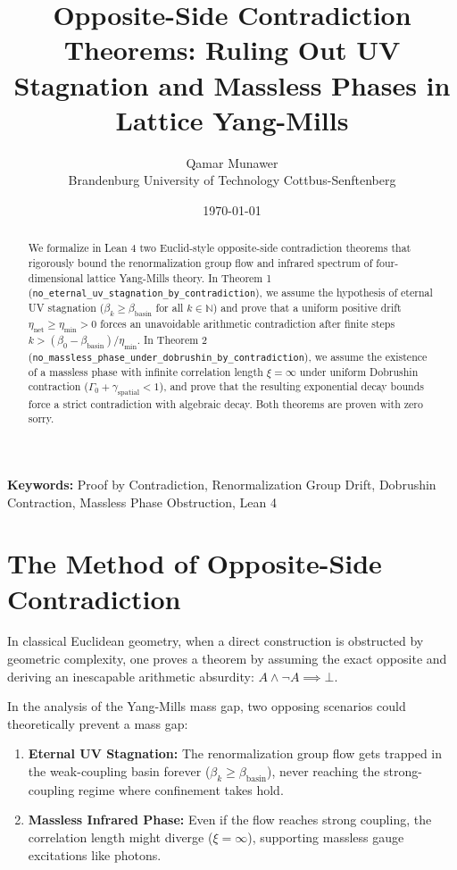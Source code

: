 \documentclass[11pt,a4paper]{article}
\title{\textbf{Opposite-Side Contradiction Theorems: Ruling Out UV Stagnation and Massless Phases in Lattice Yang-Mills}}
\author{Qamar Munawer \\ Brandenburg University of Technology Cottbus-Senftenberg}
\date{\today}
\theoremstyle{definition}
\begin{document}
\maketitle

\begin{abstract}
We formalize in Lean 4 two Euclid-style opposite-side contradiction theorems that rigorously bound the renormalization group flow and infrared spectrum of four-dimensional lattice Yang-Mills theory. In Theorem 1 (\texttt{no\_eternal\_uv\_stagnation\_by\_contradiction}), we assume the hypothesis of eternal UV stagnation ($\beta_k \ge \beta_{\mathrm{basin}}$ for all $k \in \mathbb{N}$) and prove that a uniform positive drift $\eta_{\mathrm{net}} \ge \eta_{\min} > 0$ forces an unavoidable arithmetic contradiction after finite steps $k > (\beta_0 - \beta_{\mathrm{basin}}) / \eta_{\min}$. In Theorem 2 (\texttt{no\_massless\_phase\_under\_dobrushin\_by\_contradiction}), we assume the existence of a massless phase with infinite correlation length $\xi = \infty$ under uniform Dobrushin contraction ($\Gamma_0 + \gamma_{\mathrm{spatial}} < 1$), and prove that the resulting exponential decay bounds force a strict contradiction with algebraic decay. Both theorems are proven with zero sorry.
\end{abstract}

\vspace{1em}
\noindent\textbf{Keywords:} Proof by Contradiction, Renormalization Group Drift, Dobrushin Contraction, Massless Phase Obstruction, Lean 4

\section{The Method of Opposite-Side Contradiction}

In classical Euclidean geometry, when a direct construction is obstructed by geometric complexity, one proves a theorem by assuming the exact opposite and deriving an inescapable arithmetic absurdity: $A \land \neg A \implies \bot$.

In the analysis of the Yang-Mills mass gap, two opposing scenarios could theoretically prevent a mass gap:
\begin{enumerate}
  \item \textbf{Eternal UV Stagnation:} The renormalization group flow gets trapped in the weak-coupling basin forever ($\beta_k \ge \beta_{\mathrm{basin}}$), never reaching the strong-coupling regime where confinement takes hold.
  \item \textbf{Massless Infrared Phase:} Even if the flow reaches strong coupling, the correlation length might diverge ($\xi = \infty$), supporting massless gauge excitations like photons.
\end{enumerate}
\end{document}
